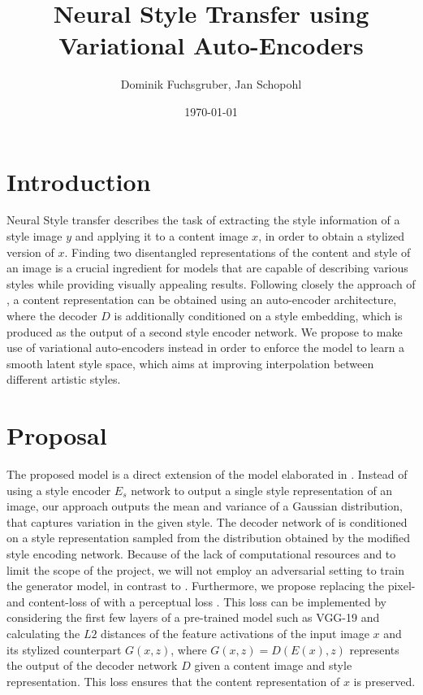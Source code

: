 \documentclass[twoside,twocolumn]{article}
\title{Neural Style Transfer using Variational Auto-Encoders} %
\author{Dominik Fuchsgruber, Jan Schopohl}
\date{\today} %
\begin{document}
\maketitle

\section{Introduction}

Neural Style transfer describes the task of extracting the style information of a style image $y$ and applying it to a content image $x$, in order to obtain a stylized version of $x$. Finding two disentangled representations of the content and style of an image is a crucial ingredient for models that are capable of describing various styles while providing visually appealing results. Following closely the approach of \cite{Kotovenko_2019_ICCV}, a content representation can be obtained using an auto-encoder architecture, where the decoder $D$ is additionally conditioned on a style embedding, which is produced as the output of a second style encoder network. We propose to make use of variational auto-encoders \cite{vae} instead in order to enforce the model to learn a smooth latent style space, which aims at improving interpolation between different artistic styles. 

\section{Proposal}

The proposed model is a direct extension of the model elaborated in \cite{Kotovenko_2019_ICCV}. Instead of using a style encoder $E_s$ network to output a single style representation of an image, our approach outputs the mean and variance of a Gaussian distribution, that captures variation in the given style. The decoder network of \cite{Kotovenko_2019_ICCV} is conditioned on a style representation sampled from the distribution obtained by the modified style encoding network. Because of the lack of computational resources and to limit the scope of the project, we will not employ an adversarial setting to train the generator model, in contrast to \cite{Kotovenko_2019_ICCV}. Furthermore, we propose replacing the pixel- and content-loss of \cite{Kotovenko_2019_ICCV} with a perceptual loss \cite{johnson}. This loss can be implemented by considering the first few layers of a pre-trained model such as VGG-19 and calculating the $L2$ distances of the feature activations of the input image $x$ and its stylized counterpart $G(x, z)$, where $G(x, z) = D(E(x), z)$ represents the output of the decoder network $D$ given a content image and style representation.
This loss ensures that the content representation of $x$ is preserved.
\end{document}
